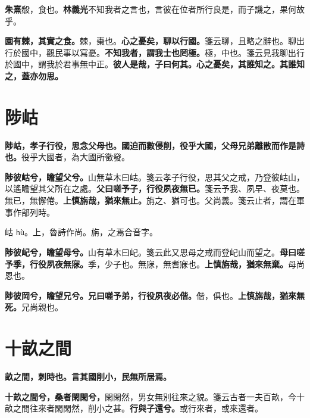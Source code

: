 \begin{quoting}\textbf{朱熹}殽，食也。\textbf{林義光}不知我者之言也，言彼在位者所行良是，而子譏之，果何故乎。\end{quoting}

\textbf{園有棘，其實之食。}{\footnotesize 棘，棗也。}\textbf{心之憂矣，聊以行國。}{\footnotesize 箋云聊，且略之辭也。聊出行於國中，觀民事以寫憂。}\textbf{不知我者，謂我士也罔極。}{\footnotesize 極，中也。箋云見我聊出行於國中，謂我於君事無中正。}\textbf{彼人是哉，子曰何其。心之憂矣，其誰知之。其誰知之，蓋亦勿思。}

\section{陟岵}


\textbf{陟岵，孝子行役，思念父母也。國迫而數侵削，役乎大國，父母兄弟離散而作是詩也。}{\footnotesize 役乎大國者，為大國所徵發。}

\textbf{陟彼岵兮，瞻望父兮。}{\footnotesize 山無草木曰岵。箋云孝子行役，思其父之戒，乃登彼岵山，以遙瞻望其父所在之處。}\textbf{父曰嗟予子，行役夙夜無已。}{\footnotesize 箋云予我、夙早、夜莫也。無已，無懈倦。}\textbf{上慎旃哉，猶來無止。}{\footnotesize 旃之、猶可也。父尚義。箋云止者，謂在軍事作部列時。}

\begin{quoting}岵 \texttt{hù}。上，魯詩作尚。旃，之焉合音字。\end{quoting}

\textbf{陟彼屺兮，瞻望母兮。}{\footnotesize 山有草木曰屺。箋云此又思母之戒而登屺山而望之。}\textbf{母曰嗟予季，行役夙夜無寐。}{\footnotesize 季，少子也。無寐，無耆寐也。}\textbf{上慎旃哉，猶來無棄。}{\footnotesize 母尚恩也。}

\textbf{陟彼岡兮，瞻望兄兮。兄曰嗟予弟，行役夙夜必偕。}{\footnotesize 偕，俱也。}\textbf{上慎旃哉，猶來無死。}{\footnotesize 兄尚親也。}

\section{十畝之間}


\textbf{畝之間，刺時也。言其國削小，民無所居焉。}

\textbf{十畝之間兮，桑者閑閑兮，}{\footnotesize 閑閑然，男女無別往來之貌。箋云古者一夫百畝，今十畝之間往來者閑閑然，削小之甚。}\textbf{行與子還兮。}{\footnotesize 或行來者，或來還者。}

